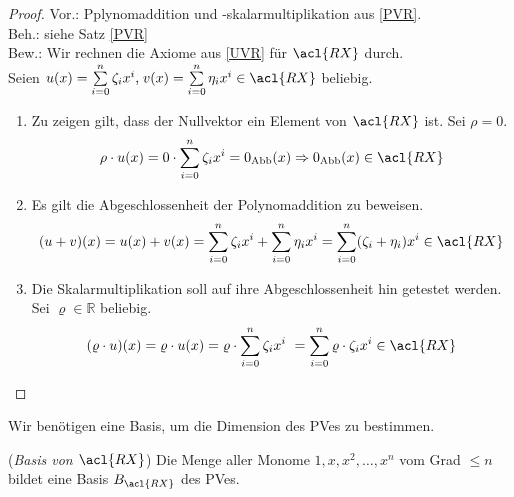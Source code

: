 \begin{proof}
Vor.: Pplynomaddition und -skalarmultiplikation aus \ref{PVR}.
\\ Beh.: siehe Satz \ref{PVR}
\\ Bew.: Wir rechnen die Axiome aus \ref{UVR} für $\acl{RX}$ durch.
\\ Seien $u(x)=\sum\limits_{i=0}^{n} \zeta_i x^i\text{,}\; v(x) = \sum\limits_{i=0}^{n} \eta_i x^i \in \acl{RX}$ beliebig.
\begin{enumerate}
\item Zu zeigen gilt, dass der Nullvektor ein Element von $\acl{RX}$ ist. Sei $\rho = 0$. \[\rho \cdot u(x)= 0 \cdot \sum\limits_{i=0}^{n} \zeta_i x^i = 0_{\Abb}(x) \Rightarrow 0_{\Abb}(x) \in \acl{RX}\]
\item Es gilt die Abgeschlossenheit der Polynomaddition zu beweisen.
\\ \[ (u+v)(x)=u(x) + v(x) = \sum\limits_{i=0}^{n} \zeta_i x^i+\sum\limits_{i=0}^{n} \eta_i x^i =\sum\limits_{i=0}^{n} (\zeta_i+ \eta_i )x^i \in \acl{RX} \]
\item Die Skalarmultiplikation soll auf ihre Abgeschlossenheit hin getestet werden. Sei $\varrho \in \mathbb{R}$ beliebig.
\[(\varrho \cdot u)(x) = \varrho \cdot u(x)= \varrho \cdot \sum\limits_{i=0}^{n} \zeta_i x^i\ = \sum\limits_{i=0}^{n} \varrho \cdot \zeta_i x^i \in \acl{RX}\qedhere\]
\end{enumerate}
\end{proof}
Wir benötigen eine Basis, um die Dimension des \acl{PV}es zu bestimmen. 
\theoremstyle{Lemma}
\begin{Lemma}({\emph{Basis von $\acl{RX}$}}) Die Menge aller Monome $1, x, x^2,…, x^n$ vom Grad $\leq n$ bildet eine Basis $B_{\acl{RX}}$ des \acl{PV}es. 
\end{Lemma}

